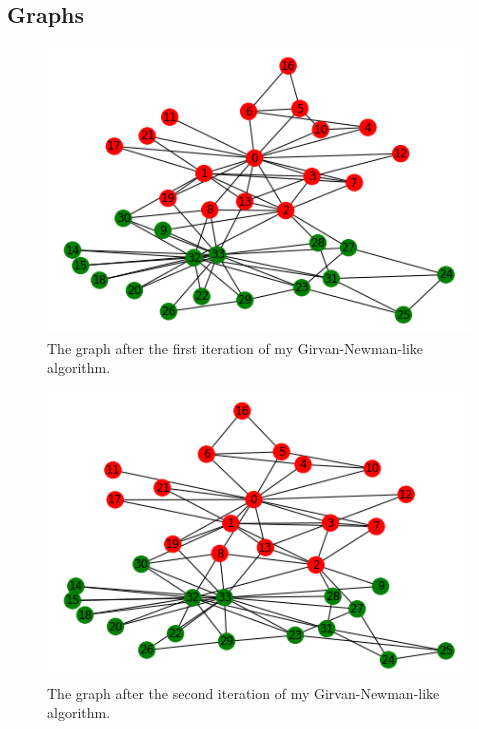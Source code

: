 \documentclass[12pt]{article}
\begin{document}
\subsection*{Graphs}
\begin{figure}[h]
    \centering
    \includegraphics{iteration1.png}
    \caption{The graph after the first iteration of my Girvan-Newman-like algorithm.}
    \label{fig:iteration1}
\end{figure}

\pagebreak

\begin{figure}[h]
    \centering
    \includegraphics{iteration2.png}
    \caption{The graph after the second iteration of my Girvan-Newman-like algorithm.}
    \label{fig:iteration2}
\end{figure}

\pagebreak
\end{document}
